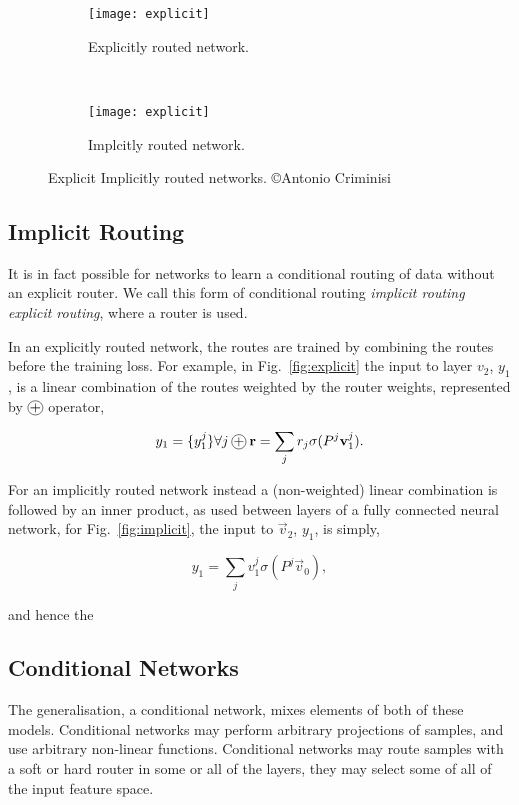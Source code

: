 \documentclass[thesis]{subfiles}
\begin{document}
\begin{figure}[htbp!] 
\centering
\begin{subfigure}[b]{0.45\textwidth}
   \centering
   \texttt{[image: explicit]}
   \caption{Explicitly routed network.}
   \label{fig:explicitRouter}
\end{subfigure}
~
\begin{subfigure}[b]{0.45\textwidth}
   \centering
   \texttt{[image: explicit]}
   \caption{Implcitly routed network.}
   \label{fig:implicitRouter}
\end{subfigure}
\caption{Explicit \vs Implicitly routed networks. \copyright Antonio Criminisi}
\label{fig:routerConnections}
\end{figure}

\subsection{Implicit Routing}
It is in fact possible for networks to learn a conditional routing of data without an explicit router. We call this form of conditional routing \emph{implicit routing} \vs \emph{explicit routing}, where a router is used. 

In an explicitly routed network, the routes are trained by combining the routes before the training loss. For example, in Fig.~\ref{fig:explicit} the input to layer $v_2$, $y_1$, is a linear combination of the routes weighted by the router weights, represented by $\circleplus$ operator,

\begin{equation}
	y_1 = \{y_1^j\} \forall j\circleplus \vec r = \sum_j r_j \sigma(P^j \vec v_1^j ).
\end{equation}

For an implicitly routed network instead a (non-weighted) linear combination is followed by an inner product, as used between layers of a fully connected neural network, \ie for Fig.~\ref{fig:implicit}, the input to $\vec v_2$, $y_1$,  is simply,

\begin{equation}
	y_1 = \sum_j v_1^j \sigma(P^j \vec v_0), 
\end{equation}

and hence the 

\subsection{Conditional Networks}
The generalisation, a conditional network, mixes elements of both of these models. Conditional networks may perform arbitrary projections of samples, and use arbitrary non-linear functions. Conditional networks may route samples with a soft or hard router in some or all of the layers, they may select some of all of the input feature space.
\end{document}
